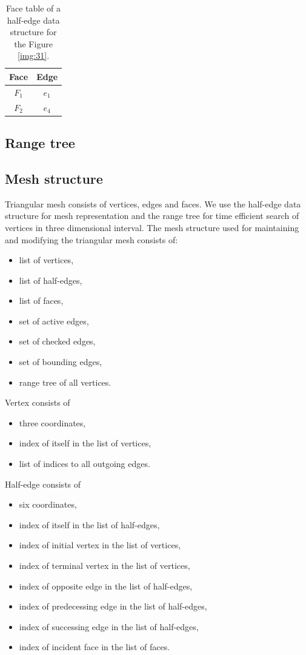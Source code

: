 \begin{table}[]
    \centering
    \begin{tabular}{|c|c|}
    \hline
    \hline
    Face  & Edge            \\ \hline\hline
    $F_1$ & $e_1$           \\ \hline
    $F_2$ & $e_4$           \\ \hline\hline
    \end{tabular}
\caption{Face table of a half-edge data structure for the Figure \ref{img:31}.}
\label{tab:7}
\end{table}


\subsection*{Range tree}
\subsection*{Mesh structure}
Triangular mesh consists of vertices, edges and faces. We use the half-edge 
data structure for mesh representation and the range tree for time efficient
search of vertices in three dimensional interval.
The mesh structure used for maintaining and modifying the triangular mesh
consists of:
\begin{itemize}
    \setlength\itemsep{-2mm}
    \item list of vertices,
    \item list of half-edges,
    \item list of faces,
    \item set of active edges,
    \item set of checked edges,
    \item set of bounding edges,
    \item range tree of all vertices.
\end{itemize}
Vertex consists of 
\begin{itemize}
    \setlength\itemsep{-2mm}
    \item three coordinates,
    \item index of itself in the list of vertices,
    \item list of indices to all outgoing edges.
\end{itemize}
Half-edge consists of 
\begin{itemize}
    \setlength\itemsep{-2mm}
    \item six coordinates,
    \item index of itself in the list of half-edges,
    \item index of initial vertex in the list of vertices, 
    \item index of terminal vertex in the list of vertices,
    \item index of opposite edge in the list of half-edges,
    \item index of predecessing edge in the list of half-edges,
    \item index of successing edge in the list of half-edges,
    \item index of incident face in the list of faces.
\end{itemize}

